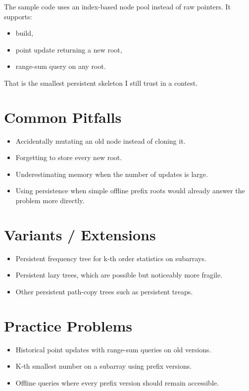 The sample code uses an index-based node pool instead of raw pointers. It supports:

\begin{itemize}
  \item build,
  \item point update returning a new root,
  \item range-sum query on any root.
\end{itemize}

That is the smallest persistent skeleton I still trust in a contest.

\section*{Common Pitfalls}

\begin{itemize}
  \item Accidentally mutating an old node instead of cloning it.
  \item Forgetting to store every new root.
  \item Underestimating memory when the number of updates is large.
  \item Using persistence when simple offline prefix roots would already answer the problem more directly.
\end{itemize}

\section*{Variants / Extensions}

\begin{itemize}
  \item Persistent frequency tree for k-th order statistics on subarrays.
  \item Persistent lazy trees, which are possible but noticeably more fragile.
  \item Other persistent path-copy trees such as persistent treaps.
\end{itemize}

\section*{Practice Problems}

\begin{itemize}
  \item Historical point updates with range-sum queries on old versions.
  \item K-th smallest number on a subarray using prefix versions.
  \item Offline queries where every prefix version should remain accessible.
\end{itemize}


